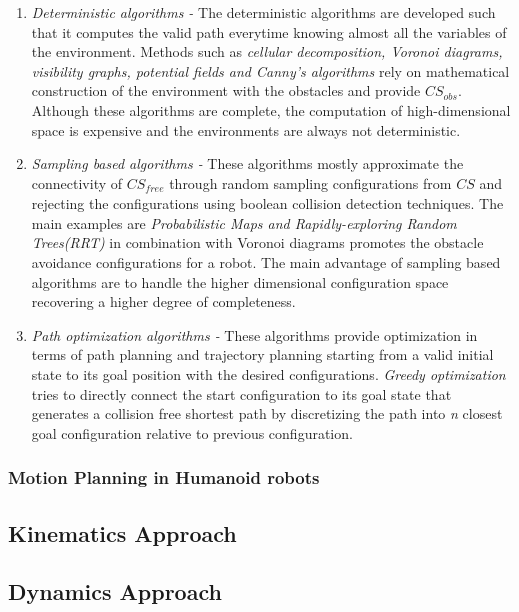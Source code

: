 \begin{enumerate}
    \item \textit{Deterministic algorithms -} The deterministic algorithms are developed such that it computes the valid path everytime knowing almost
    all the variables of the environment. Methods such as \textit{cellular decomposition, Voronoi diagrams, visibility graphs, potential fields and Canny's algorithms}
    rely on
    mathematical construction of the environment with the obstacles and provide $\mathit{CS_{obs}}$. Although these algorithms are complete, the computation
    of high-dimensional space is expensive and the environments are always not deterministic.

    \item \textit{Sampling based algorithms -} These algorithms mostly approximate the connectivity of $\mathit{CS_{free}}$ through random sampling configurations
    from $\mathit{CS}$ and rejecting the configurations using boolean collision detection techniques. The main examples are  \textit{Probabilistic Maps and
    Rapidly-exploring Random Trees(RRT)} in combination with Voronoi diagrams promotes the obstacle avoidance configurations for a robot. The main advantage of
    sampling based algorithms are to handle the higher dimensional configuration space recovering a higher degree of completeness.

    \item \textit{Path optimization algorithms -} These algorithms provide optimization in terms of path planning and trajectory planning starting from a valid
    initial state to its goal position with the desired configurations. \textit{Greedy optimization} tries to directly connect the start configuration to 
    its goal state that generates a collision free shortest path by discretizing the path into \textit{n} closest goal configuration relative to previous 
    configuration.
\end{enumerate}

\subsubsection{Motion Planning in Humanoid robots}

\subsection{Kinematics Approach}
\subsection{Dynamics Approach}
